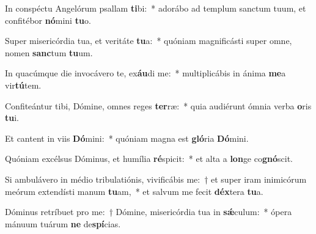 \item In conspéctu Angelórum psallam \textbf{ti}bi:~* adorábo ad templum sanctum tuum, et confitébor \textbf{nó}mini \textbf{tu}o.
\item Super misericórdia tua, et veritáte \textbf{tu}a:~* quóniam magnificásti super omne, nomen \textbf{sanc}tum \textbf{tu}um.
\item In quacúmque die invocávero te, ex\textbf{áu}di me:~* multiplicábis in ánima \textbf{me}a vir\textbf{tú}tem.
\item Confiteántur tibi, Dómine, omnes reges \textbf{ter}ræ:~* quia audiérunt ómnia verba \textbf{o}ris \textbf{tu}i.
\item Et cantent in viis \textbf{Dó}mini:~* quóniam magna est \textbf{gló}ria \textbf{Dó}mini.
\item Quóniam excélsus Dóminus, et humília \textbf{ré}spicit:~* et alta a \textbf{lon}ge co\textbf{gnó}scit.
\item Si ambulávero in médio tribulatiónis, vivificábis me:~† et super iram inimicórum meórum extendísti manum \textbf{tu}am,~* et salvum me fecit \textbf{déx}tera \textbf{tu}a.
\item Dóminus retríbuet pro me:~† Dómine, misericórdia tua in \textbf{sǽ}culum:~* ópera mánuum tuárum \textbf{ne} de\textbf{spí}cias.
